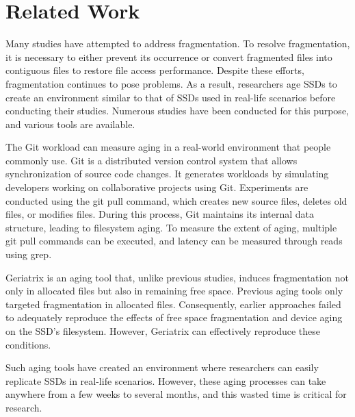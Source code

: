 \section{Related Work} %
\label{s:related}

Many studies have attempted to address fragmentation. 
To resolve fragmentation, it is necessary to either prevent its occurrence or convert fragmented files into contiguous files to restore file access performance.
Despite these efforts, fragmentation continues to pose problems. As a result, researchers age SSDs to create an environment similar to that of SSDs used in real-life scenarios before conducting their studies. 
Numerous studies have been conducted for this purpose, and various tools are available.

The Git workload\cite{conway2017fragment} can measure aging in a real-world environment that people commonly use.
Git is a distributed version control system that allows synchronization of source code changes.
It generates workloads by simulating developers working on collaborative projects using Git. 
Experiments are conducted using the git pull command, which creates new source files, deletes old files, or modifies files. During this process, Git maintains its internal data structure, leading to filesystem aging.
To measure the extent of aging, multiple git pull commands can be executed, and latency can be measured through reads using grep.

Geriatrix\cite{Before_utilizer_Geriatrix} is an aging tool that, unlike previous studies, induces fragmentation not only in allocated files but also in remaining free space.
Previous aging tools only targeted fragmentation in allocated files. 
Consequently, earlier approaches failed to adequately reproduce the effects of free space fragmentation and device aging on the SSD's filesystem.
However, Geriatrix can effectively reproduce these conditions.

Such aging tools have created an environment where researchers can easily replicate SSDs in real-life scenarios.
However, these aging processes can take anywhere from a few weeks to several months, and this wasted time is critical for research.
